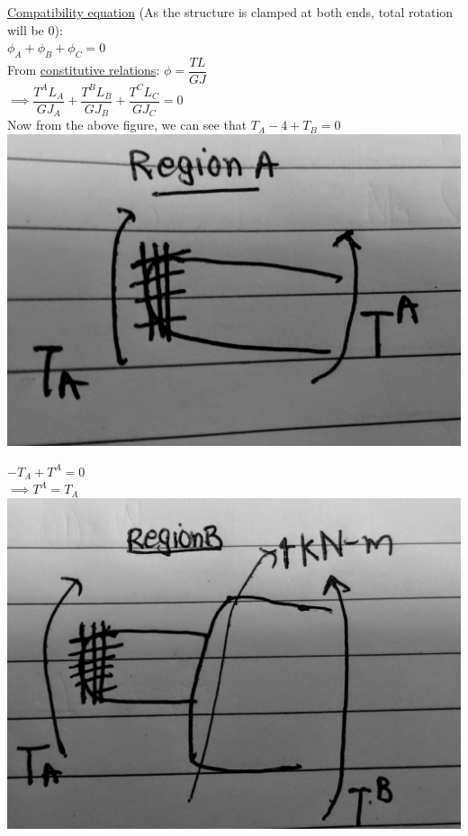 \documentclass{article}
\begin{document}
\noindent \underline{Compatibility equation} (As the structure is clamped at both ends, total rotation will be 0): \\
$\phi_A+\phi_B+\phi_C=0$\\
From \underline{constitutive relations}: 
$\phi= \dfrac{TL}{GJ}$\\
$\implies \dfrac{T^AL_A}{GJ_A}+ \dfrac{T^BL_B}{GJ_B}+ \dfrac{T^CL_C}{GJ_C}=0$\\

\noindent Now from the above figure, we can see that $T_A- 4 + T_B = 0 $\\

\bigbreak
\includegraphics[scale=0.05]{A.jpg} 

\bigbreak
\noindent $-T_A+T^A=0$\\
$\implies T^A=T_A$\\

\includegraphics[scale=0.05]{B.jpg}
\end{document}
